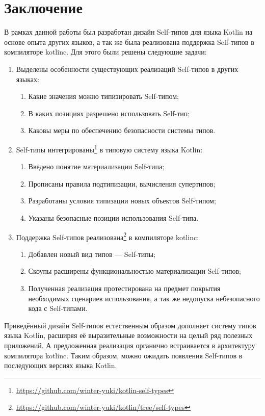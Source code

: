 \section*{Заключение}

В рамках данной работы был разработан дизайн Self-типов для языка Kotlin на основе опыта других языков, а так же была реализована поддержка Self-типов в компиляторе kotlinc.
Для этого были решены следующие задачи:
\begin{enumerate}
    \item Выделены особенности существующих реализаций Self-типов в других языках:
    \begin{enumerate}
        \item Какие значения можно типизировать Self-типом;
        \item В каких позициях разрешено использовать Self-тип;
        \item Каковы меры по обеспечению безопасности системы типов.
    \end{enumerate}
    \item Self-типы интегрированы\footnote{\url{https://github.com/winter-yuki/kotlin-self-types}} в типовую систему языка Kotlin:
    \begin{enumerate}
        \item Введено понятие материализации Self-типа;
        \item Прописаны правила подтипизации, вычисления супертипов;
        \item Разработаны условия типизации новых объектов Self-типом;
        \item Указаны безопасные позиции использования Self-типа.
    \end{enumerate}
    \item Поддержка Self-типов реализована\footnote{\url{https://github.com/winter-yuki/kotlin/tree/self-types}} в компиляторе kotlinc:
    \begin{enumerate}
        \item Добавлен новый вид типов --- Self-типы;
        \item Скоупы расширены функциональностью материализации Self-типов;
        \item Полученная реализация протестирована на предмет покрытия необходимых сценариев использования, а так же недопуска небезопасного кода с Self-типами.
    \end{enumerate}
\end{enumerate}

Приведённый дизайн Self-типов естественным образом дополняет систему типов языка Kotlin, расширяя её выразительные возможности на целый ряд полезных приложений.
А предложенная реализация органично встраивается в архитектуру компилятора kotlinc.
Таким образом, можно ожидать появления Self-типов в последующих версиях языка Kotlin.
